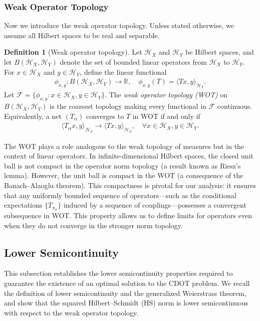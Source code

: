 \documentclass{article}
\theoremstyle{plain}
\theoremstyle{definition}
\newtheorem{definition}[theorem]{Definition}
\theoremstyle{remark}
\begin{document}
\subsubsection{Weak Operator Topology}
Now we introduce the weak operator topology. Unless stated otherwise, we assume all Hilbert spaces to be real and separable.
\begin{definition}[Weak operator topology]
	Let $\mathcal{H}_X$ and $\mathcal{H}_Y$ be Hilbert spaces, and let $B(\mathcal{H}_X,\mathcal{H}_Y)$ denote the set of bounded linear operators from $\mathcal{H}_X$ to $\mathcal{H}_Y$. For $x \in \mathcal{H}_X$ and $y \in \mathcal{H}_Y$, define the linear functional
	\begin{align*}
		\phi_{x,y} : B(\mathcal{H}_X,\mathcal{H}_Y) \to \mathbb{R} , \quad \phi_{x,y}(T) = \langle Tx, y \rangle_{\mathcal{H}_Y} .
	\end{align*}
	Let $\mathcal{F} = \{\phi_{x,y} : x \in \mathcal{H}_X , y \in \mathcal{H}_Y \}$. The \emph{weak operator topology (WOT)} on $B(\mathcal{H}_X,\mathcal{H}_Y)$ is the coarsest topology making every functional in $\mathcal{F}$ continuous. Equivalently, a net $(T_\alpha)$ converges to $T$ in WOT if and only if
	\begin{align*}
		\langle T_{\alpha}x, y \rangle_{\mathcal{H}_Y} \to \langle Tx, y \rangle_{\mathcal{H}_Y} , \quad \forall x \in \mathcal{H}_X, y \in \mathcal{H}_Y .
	\end{align*}
\end{definition}

The WOT plays a role analogous to the weak topology of measures but in the context of linear operators. In infinite-dimensional Hilbert spaces, the closed unit ball is not compact in the operator norm topology (a result known as Riesz's lemma). However, the unit ball is compact in the WOT (a consequence of the Banach--Alaoglu theorem). This compactness is pivotal for our analysis: it ensures that any uniformly bounded sequence of operators---such as the conditional expectations $\{T_{\pi_n}\}$ induced by a sequence of couplings---possesses a convergent subsequence in WOT. This property allows us to define limits for operators even when they do not converge in the stronger norm topology.

\subsection{Lower Semicontinuity}
This subsection establishes the lower semicontinuity properties required to guarantee the existence of an optimal solution to the CDOT problem.
We recall the definition of lower semicontinuity and the generalized Weierstrass theorem, and show that the squared Hilbert--Schmidt (HS) norm is lower semicontinuous with respect to the weak operator topology.
\end{document}
